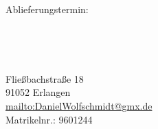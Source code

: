 \documentclass[german,11pt,a4paper]{report} %
\begin{document}
\begin{center}
\begin{large}
Ablieferungstermin: \date{\today} \\
\end{large}
\end{center}

\vspace{1,5cm}

\begin{center}
\begin{large}
\author{Daniel Wolfschmidt}\\
\end{large}
Fließbachstraße 18\\ 
91052 Erlangen\\ 
\url{mailto:DanielWolfschmidt@gmx.de}\\
Matrikelnr.: 9601244  \\
\end{center}



\newpage
\setcounter{page}{1}
\tableofcontents
\newpage
\listoffigures
\newpage
\listoftables
\newpage


\pagestyle{fancy}


\fancyhf{} %
\renewcommand{\headrulewidth}{0pt} %
\cfoot{\thepage}
\end{document}
